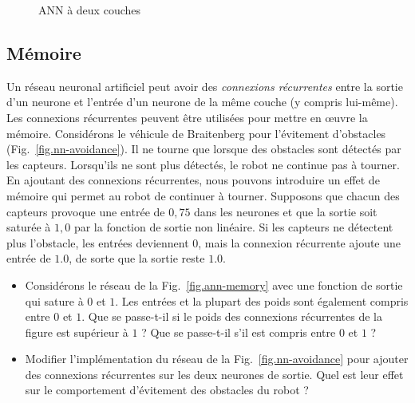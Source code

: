 \begin{figure}
\begin{center}
\caption{ANN à deux couches}
\label{fig.two-layer-ann}
\end{center}
\end{figure}

\subsection{Mémoire}\label{s.ann-mémoire}

Un réseau neuronal artificiel peut avoir des \emph{connexions récurrentes} entre la sortie d'un neurone et l'entrée d'un neurone de la même couche (y compris lui-même). Les connexions récurrentes peuvent être utilisées pour mettre en œuvre la mémoire. Considérons le véhicule de Braitenberg pour l'évitement d'obstacles (Fig.~\ref{fig.nn-avoidance}). Il ne tourne que lorsque des obstacles sont détectés par les capteurs. Lorsqu'ils ne sont plus détectés, le robot ne continue pas à tourner. En ajoutant des connexions récurrentes, nous pouvons introduire un effet de mémoire qui permet au robot de continuer à tourner. Supposons que chacun des capteurs provoque une entrée de $0,75$ dans les neurones et que la sortie soit saturée à $1,0$ par la fonction de sortie non linéaire. Si les capteurs ne détectent plus l'obstacle, les entrées deviennent $0$, mais la connexion récurrente ajoute une entrée de $1.0$, de sorte que la sortie reste $1.0$.

\begin{framed}
\begin{itemize}
\item Considérons le réseau de la Fig.~\ref{fig.ann-memory} avec une fonction de sortie qui sature à $0$ et $1$. Les entrées et la plupart des poids sont également compris entre $0$ et $1$. Que se passe-t-il si le poids des connexions récurrentes de la figure est supérieur à $1$ ? Que se passe-t-il s'il est compris entre $0$ et $1$ ?
\item Modifier l'implémentation du réseau de la Fig.~\ref{fig.nn-avoidance} pour ajouter des connexions récurrentes sur les deux neurones de sortie. Quel est leur effet sur le comportement d'évitement des obstacles du robot ?
\end{itemize}
\end{framed}

